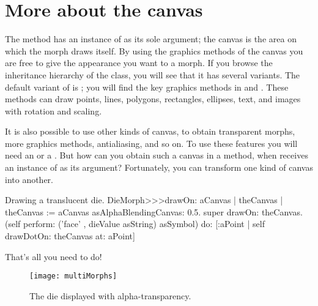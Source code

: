 \documentclass[a4paper,10pt,twoside]{book}
\begin{document}


\section{More about the canvas}

The  method has an instance of  as its sole argument;
the canvas is the area on which the morph draws itself.
By using the graphics methods of the canvas you are free to give the appearance you want to a morph.
If you browse the inheritance hierarchy of the  class, you will see that it has several variants.
The default variant of  is ; you will find the key graphics methods in  and .
These methods can draw points, lines, polygons, rectangles, ellipses, text, and images with rotation and scaling.

It is also possible to use other kinds of canvas, to obtain transparent morphs, more graphics methods, antialiasing, and so on.
To use these features you will need an  or a .
But how can you obtain such a canvas in a  method, when  receives an instance of  as its argument?
Fortunately, you can transform one kind of canvas into another.

\begin{method}{Drawing a translucent die.}
DieMorph>>>drawOn: aCanvas
	| theCanvas |
	theCanvas := aCanvas asAlphaBlendingCanvas: 0.5.
	super drawOn: theCanvas.
	(self perform: ('face' , dieValue asString) asSymbol)
		do: [:aPoint | self drawDotOn: theCanvas at: aPoint]
\end{method}
\noindent
That's all you need to do!

\begin{figure}[ht]
	\centerline{\texttt{[image: multiMorphs]}}
	\caption{The die displayed with alpha-transparency.
		}
\end{figure}


\end{document}
